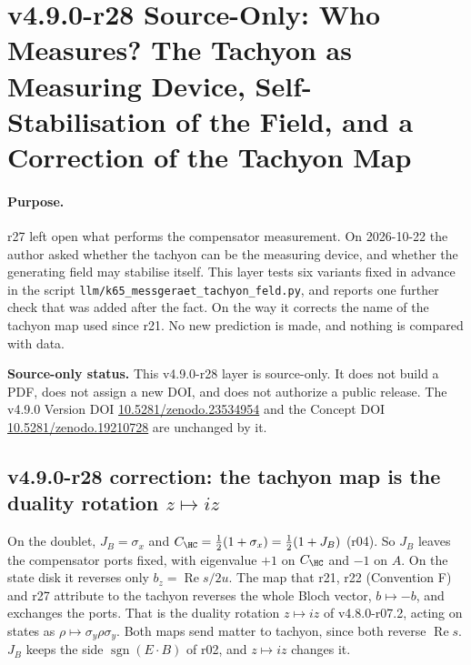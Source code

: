 \clearpage
\section*{v4.9.0-r28 Source-Only: Who Measures? The Tachyon as Measuring Device, Self-Stabilisation of the Field, and a Correction of the Tachyon Map}
\label{sec:v490-r28-who-measures}

\paragraph{Purpose.}
r27 left open what performs the compensator measurement.  On 2026-10-22 the author asked whether the tachyon can be the
measuring device, and whether the generating field may stabilise itself.  This layer tests six variants fixed in advance in the
script \texttt{llm/k65\_messgeraet\_tachyon\_feld.py}, and reports one further check that was added after the fact.  On the way it
corrects the name of the tachyon map used since r21.  No new prediction is made, and nothing is compared with data.

\noindent\textbf{Source-only status.}
This v4.9.0-r28 layer is source-only.  It does not build a PDF, does not assign a new DOI,
and does not authorize a public release.  The v4.9.0 Version DOI
\href{https://doi.org/10.5281/zenodo.23534954}{10.5281/zenodo.23534954} and the Concept DOI
\href{https://doi.org/10.5281/zenodo.19210728}{10.5281/zenodo.19210728} are unchanged by it.

\subsection*{v4.9.0-r28 correction: the tachyon map is the duality rotation \texorpdfstring{\(z\mapsto iz\)}{z -> iz}}
\label{subsec:v490-r28-correction}

On the doublet, \(J_B=\sigma_x\) and \(C_{\HC}=\tfrac12(1+\sigma_x)=\tfrac12(1+J_B)\) (r04).  So \(J_B\) leaves the compensator ports
fixed, with eigenvalue \(+1\) on \(C_{\HC}\) and \(-1\) on \(A\).  On the state disk it reverses only \(b_z=\operatorname{Re}s/2u\).  The map
that r21, r22 (Convention F) and r27 attribute to the tachyon reverses the whole Bloch vector, \(b\mapsto-b\), and exchanges the
ports.  That is the duality rotation \(z\mapsto iz\) of v4.8.0-r07.2, acting on states as \(\rho\mapsto\sigma_y\rho\sigma_y\).  Both maps
send matter to tachyon, since both reverse \(\operatorname{Re}s\).  \(J_B\) keeps the side \(\operatorname{sgn}(E\cdot B)\) of r02, and
\(z\mapsto iz\) changes it.

